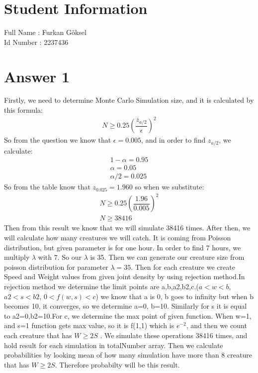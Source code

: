 \documentclass[12pt]{article}
\begin{document}
\section*{Student Information }
Full Name : Furkan Göksel  \\
Id Number : 2237436 \\

\section*{Answer 1}
Firstly, we need to determine Monte Carlo Simulation size, and it is calculated by this formula:
\begin{gather*}
    N \geq 0.25(\dfrac{z_{a/2}}{\epsilon})^2
\end{gather*}
So from the question we know that $\epsilon = 0.005$, and in order to find $z_{a/2}$, we calculate:
\begin{gather*}
    1-\alpha = 0.95 \\
    \alpha = 0.05 \\
    \alpha / 2 = 0.025
\end{gather*}
So from the table know that $z_{0.025} = 1.960$ so when we substitute:
\begin{gather*}
    N \geq 0.25(\dfrac{1.96}{0.005})^2 \\
    N \geq 38416
\end{gather*}
Then from this result we know that we will simulate 38416 times. After then, we will calculate how many creatures we will catch. It is coming from Poisson distribution, but given parameter is for one hour. In order to find 7 hours, we multiply $\lambda$ with 7. So our $\lambda$ is 35. Then we can generate our creature size from poisson distribution for parameter $\lambda = 35$. Then for each creature we create Speed and Weight values from given joint density by using rejection method.In rejection method we determine the limit points are a,b,a2,b2,c.($a<w<b$, $a2<s<b2$, $0<f(w,s)<c$) we know that a is 0, b goes to infinity but when b becomes 10, it converges, so we determine a=0, b=10. Similarly for s it is equal to a2=0,b2=10.For c, we determine the max point of given function. When w=1, and s=1 function gets max value, so it is f(1,1) which is $e^{-2}$, and then we count each creature that has $W \geq 2S$ . We simulate these operations 38416 times, and hold result for each simulation in totalNumber array. Then we calculate probabilities by looking mean of how many simulation have more than 8 creature that has  $W \geq 2S$. Therefore probabilty will be this result.
\end{document}
